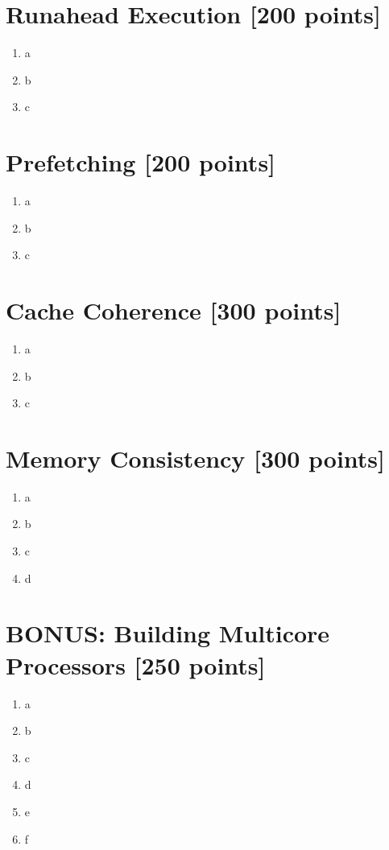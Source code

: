\documentclass[a4paper]{article}
\begin{document}
\section{Runahead Execution [200 points]}

\begin{enumerate}[label=\alph*)]
    \item a
    \item b
    \item c
\end{enumerate}

\section{Prefetching [200 points]}

\begin{enumerate}[label=\alph*)]
    \item a
    \item b
    \item c
\end{enumerate}

\section{Cache Coherence [300 points]}

\begin{enumerate}[label=\alph*)]
    \item a
    \item b
    \item c
\end{enumerate}

\section{Memory Consistency [300 points]}

\begin{enumerate}[label=\alph*)]
    \item a
    \item b
    \item c
    \item d
\end{enumerate}

\section{BONUS: Building Multicore Processors [250 points]}

\begin{enumerate}[label=\alph*)]
    \item a
    \item b
    \item c
    \item d
    \item e
    \item f
\end{enumerate}
\end{document}
